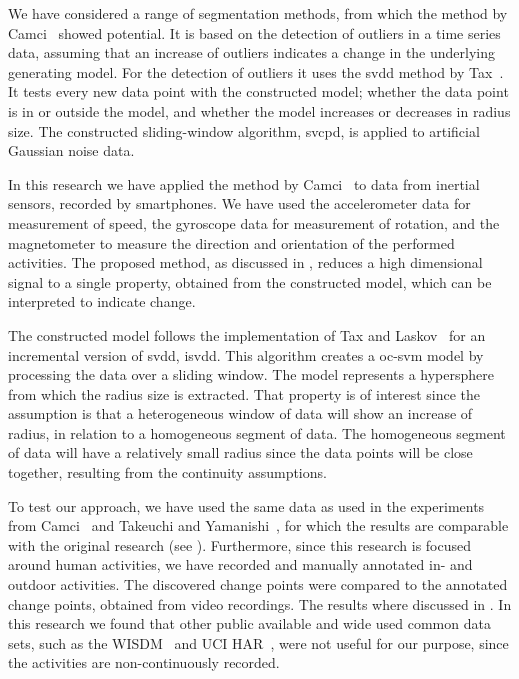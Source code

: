 We have considered a range of segmentation methods, from which the method by Camci~\cite{camci2010change} showed potential.
It is based on the detection of outliers in a time series data, assuming that an increase of outliers indicates a change in the underlying generating model.
For the detection of outliers it uses the \gls{svdd} method by Tax~\cite{tax1999support}.
It tests every new data point with the constructed model; whether the data point is in or outside the model, and whether the model increases or decreases in radius size.
The constructed sliding-window algorithm, \gls{svcpd}, is applied to artificial Gaussian noise data.

In this research we have applied the method by Camci~\cite{camci2010change} to data from inertial sensors, recorded by smartphones.
We have used the accelerometer data for measurement of speed, the gyroscope data for measurement of rotation, and the magnetometer to measure the direction and orientation of the performed activities.
The proposed method, as discussed in , reduces a high dimensional signal to a single property, obtained from the constructed model, which can be interpreted to indicate change.

The constructed model follows the implementation of Tax and Laskov~\cite{tax2003online} for an incremental version of \gls{svdd}, \gls{isvdd}.
This algorithm creates a \gls{oc-svm} model by processing the data over a sliding window.
The model represents a hypersphere from which the radius size is extracted.
That property is of interest since the assumption is that a heterogeneous window of data will show an increase of radius, in relation to a homogeneous segment of data.
The homogeneous segment of data will have a relatively small radius since the data points will be close together, resulting from the continuity assumptions.

To test our approach, we have used the same data as used in the experiments from Camci~\cite{camci2010change} and Takeuchi and Yamanishi~\cite{takeuchi2006unifying}, for which the results are comparable with the original research (see ).
Furthermore, since this research is focused around human activities, we have recorded and manually annotated in- and outdoor activities.
The discovered change points were compared to the annotated change points, obtained from video recordings.
The results where discussed in .
In this research we found that other public available and wide used common data sets, such as the WISDM~\cite{kwapisz2011activity} and UCI HAR~\cite{anguita2012human}, were not useful for our purpose, since the activities are non-continuously recorded.

